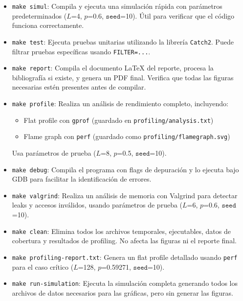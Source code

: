 \documentclass[12pt,a4paper]{article}
\begin{document}
\begin{itemize}

\item \texttt{make simul}: Compila y ejecuta una simulación rápida con parámetros predeterminados ($L$=4, $p$=0.6, $\texttt{seed}$=10). Útil para verificar que el código funciona correctamente.

\item \texttt{make test}: Ejecuta pruebas unitarias utilizando la librería \texttt{Catch2}. Puede filtrar pruebas específicas usando \texttt{FILTER=...}.

\item \texttt{make report}: Compila el documento LaTeX del reporte, procesa la bibliografía si existe, y genera un PDF final. Verifica que todas las figuras necesarias estén presentes antes de compilar.

\item \texttt{make profile}: Realiza un análisis de rendimiento completo, incluyendo:
\begin{itemize}
    \item Flat profile con \texttt{gprof} (guardado en \texttt{profiling/analysis.txt})
    \item Flame graph con \texttt{perf} (guardado como \texttt{profiling/flamegraph.svg})
\end{itemize}
Usa parámetros de prueba ($L$=8, $p$=0.5, $\texttt{seed}$=10).

\item \texttt{make debug}: Compila el programa con flags de depuración y lo ejecuta bajo GDB para facilitar la identificación de errores.

\item \texttt{make valgrind}: Realiza un análisis de memoria con Valgrind para detectar leaks y accesos inválidos, usando parámetros de prueba ($L$=6, $p$=0.6, $\texttt{seed}$=10).

\item \texttt{make clean}: Elimina todos los archivos temporales, ejecutables, datos de cobertura y resultados de profiling. No afecta las figuras ni el reporte final.

\item \texttt{make profiling-report.txt}: Genera un flat profile detallado usando \texttt{perf} para el caso crítico ($L$=128, $p$=0.59271, $\texttt{seed}$=10).

\item \texttt{make run-simulation}: Ejecuta la simulación completa generando todos los archivos de datos necesarios para las gráficas, pero sin generar las figuras.


\end{itemize}
\end{document}
